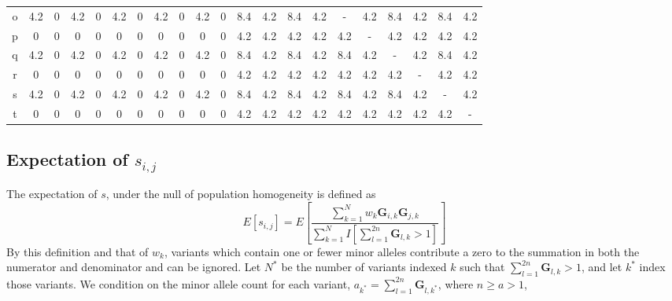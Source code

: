 {\begin{tabular}{c|c|c|c|c|c|c|c|c|c|c|c|c|c|c|c|c|c|c|c|c|}
o & 4.2 & 0 & 4.2 & 0 & 4.2 & 0 & 4.2 & 0 & 4.2 & 0 & 8.4 & 4.2 & 8.4 & 4.2 & - & 4.2 & 8.4 & 4.2 & 8.4 & 4.2\tabularnewline
\cline{2-21} 
p & 0 & 0 & 0 & 0 & 0 & 0 & 0 & 0 & 0 & 0 & 4.2 & 4.2 & 4.2 & 4.2 & 4.2 & - & 4.2 & 4.2 & 4.2 & 4.2\tabularnewline
\cline{2-21} 
q & 4.2 & 0 & 4.2 & 0 & 4.2 & 0 & 4.2 & 0 & 4.2 & 0 & 8.4 & 4.2 & 8.4 & 4.2 & 8.4 & 4.2 & - & 4.2 & 8.4 & 4.2\tabularnewline
\cline{2-21} 
r & 0 & 0 & 0 & 0 & 0 & 0 & 0 & 0 & 0 & 0 & 4.2 & 4.2 & 4.2 & 4.2 & 4.2 & 4.2 & 4.2 & - & 4.2 & 4.2\tabularnewline
\cline{2-21} 
s & 4.2 & 0 & 4.2 & 0 & 4.2 & 0 & 4.2 & 0 & 4.2 & 0 & 8.4 & 4.2 & 8.4 & 4.2 & 8.4 & 4.2 & 8.4 & 4.2 & - & 4.2\tabularnewline
\cline{2-21} 
t & 0 & 0 & 0 & 0 & 0 & 0 & 0 & 0 & 0 & 0 & 4.2 & 4.2 & 4.2 & 4.2 & 4.2 & 4.2 & 4.2 & 4.2 & 4.2 & -\tabularnewline
\cline{2-21} 
\end{tabular}

}

\subsection{Expectation of $s_{i,j}$}

The expectation of $s$, under the null of population homogeneity
is defined as
\[
E\left[s_{i,j}\right]=E\left[\frac{\sum_{k=1}^{N}w_{k}\mathbf{G}_{i,k}\mathbf{G}_{j,k}}{\sum_{k=1}^{N}I\left[\sum_{l=1}^{2n}\mathbf{G}_{l,k}>1\right]}\right]
\]
By this definition and that of $w_{k}$, variants which contain one
or fewer minor alleles contribute a zero to the summation in both
the numerator and denominator and can be ignored. Let $N^{*}$ be
the number of variants indexed $k$ such that $\sum_{l=1}^{2n}\mathbf{G}_{l,k}>1$,
and let $k^{*}$ index those variants. We condition on the minor allele
count for each variant, $a_{k^{*}}=\sum_{l=1}^{2n}\mathbf{G}_{l,k^{*}}$,
where $n\ge a>1$,

